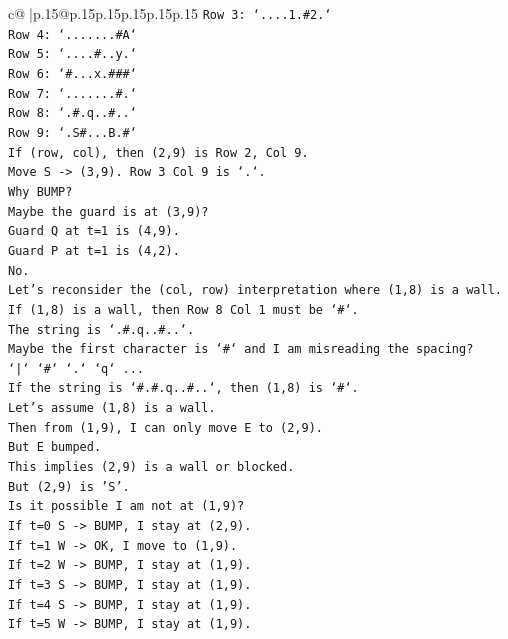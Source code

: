 \documentclass{article}
\begin{document}
{\begin{supertabular}{c@{$\;$}|p{.15\linewidth}@{}p{.15\linewidth}p{.15\linewidth}p{.15\linewidth}p{.15\linewidth}p{.15\linewidth}}
{{{\texttt{Row 3: `....1.\#2.`} \\
\texttt{Row 4: `.......\#A`} \\
\texttt{Row 5: `....\#..y.`} \\
\texttt{Row 6: `\#...x.\#\#\#`} \\
\texttt{Row 7: `.......\#.`} \\
\texttt{Row 8: `.\#.q..\#..`} \\
\texttt{Row 9: `.S\#...B.\#`} \\
\texttt{If (row, col), then (2,9) is Row 2, Col 9.} \\
\texttt{Move S {-}> (3,9). Row 3 Col 9 is `.`.} \\
\texttt{Why BUMP?} \\
\texttt{Maybe the guard is at (3,9)?} \\
\texttt{Guard Q at t=1 is (4,9).} \\
\texttt{Guard P at t=1 is (4,2).} \\
\texttt{No.} \\
\texttt{Let's reconsider the (col, row) interpretation where (1,8) is a wall.} \\
\texttt{If (1,8) is a wall, then Row 8 Col 1 must be `\#`.} \\
\texttt{The string is `.\#.q..\#..`.} \\
\texttt{Maybe the first character is `\#` and I am misreading the spacing?} \\
\texttt{`|` `\#` `.` `q` ...} \\
\texttt{If the string is `\#.\#.q..\#..`, then (1,8) is `\#`.} \\
\texttt{Let's assume (1,8) is a wall.} \\
\texttt{Then from (1,9), I can only move E to (2,9).} \\
\texttt{But E bumped.} \\
\texttt{This implies (2,9) is a wall or blocked.} \\
\texttt{But (2,9) is 'S'.} \\
\texttt{Is it possible I am not at (1,9)?} \\
\texttt{If t=0 S {-}> BUMP, I stay at (2,9).} \\
\texttt{If t=1 W {-}> OK, I move to (1,9).} \\
\texttt{If t=2 W {-}> BUMP, I stay at (1,9).} \\
\texttt{If t=3 S {-}> BUMP, I stay at (1,9).} \\
\texttt{If t=4 S {-}> BUMP, I stay at (1,9).} \\
\texttt{If t=5 W {-}> BUMP, I stay at (1,9).} \\
}}}
\end{supertabular}}
\end{document}
